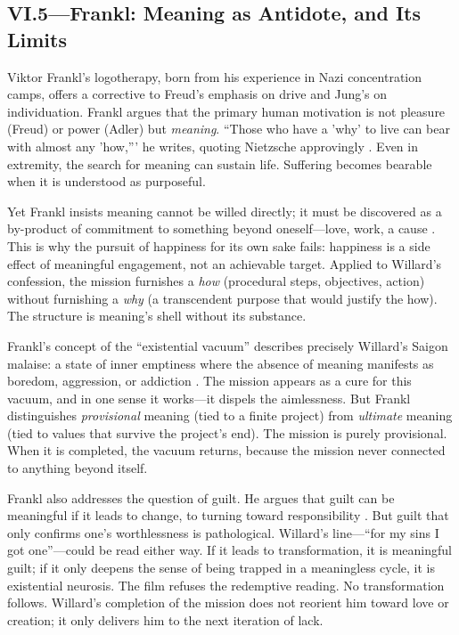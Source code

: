 \subsection*{VI.5—Frankl: Meaning as Antidote, and Its Limits}
\label{ssec:vi-frankl}

Viktor Frankl's logotherapy, born from his experience in Nazi concentration camps, offers a 
corrective to Freud's emphasis on drive and Jung's on individuation. Frankl argues that the 
primary human motivation is not pleasure (Freud) or power (Adler) but \emph{meaning}. 
``Those who have a 'why' to live can bear with almost any 'how,''' he writes, quoting 
Nietzsche approvingly \parencite[p.~104]{FranklMeaning2006}. Even in extremity, the search 
for meaning can sustain life. Suffering becomes bearable when it is understood as purposeful.

Yet Frankl insists meaning cannot be willed directly; it must be discovered as a by-product of 
commitment to something beyond oneself---love, work, a cause \parencite[pp.~110--115]{FranklMeaning2006}. 
This is why the pursuit of happiness for its own sake fails: happiness is a side effect of 
meaningful engagement, not an achievable target. Applied to Willard's confession, the mission 
furnishes a \emph{how} (procedural steps, objectives, action) without furnishing a \emph{why} 
(a transcendent purpose that would justify the how). The structure is meaning's shell without 
its substance.

Frankl's concept of the ``existential vacuum'' describes precisely Willard's Saigon malaise: a 
state of inner emptiness where the absence of meaning manifests as boredom, aggression, or 
addiction \parencite[pp.~127--129]{FranklMeaning2006}. The mission appears as a cure for this 
vacuum, and in one sense it works---it dispels the aimlessness. But Frankl distinguishes 
\emph{provisional} meaning (tied to a finite project) from \emph{ultimate} meaning (tied to 
values that survive the project's end). The mission is purely provisional. When it is 
completed, the vacuum returns, because the mission never connected to anything beyond itself.

Frankl also addresses the question of guilt. He argues that guilt can be meaningful if it 
leads to change, to turning toward responsibility \parencite[pp.~131--133]{FranklMeaning2006}. 
But guilt that only confirms one's worthlessness is pathological. Willard's line---``for my 
sins I got one''---could be read either way. If it leads to transformation, it is meaningful 
guilt; if it only deepens the sense of being trapped in a meaningless cycle, it is existential 
neurosis. The film refuses the redemptive reading. No transformation follows. Willard's 
completion of the mission does not reorient him toward love or creation; it only delivers him 
to the next iteration of lack.

